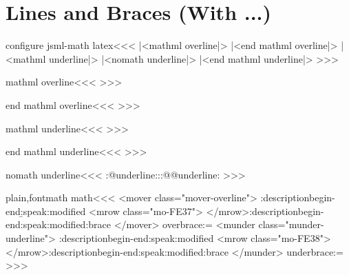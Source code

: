 {%
\section{Lines and Braces (With ...)}


\<configure jsml-math latex\><<<
   {\bgroup\ifmathml |<mathml overline|>\else
         \fi}
   {\ifmathml |<end mathml overline|>\else 
                  \fi\egroup}
   {\bgroup
    \ifmathml |<mathml underline|>%
    \else |<nomath underline|>%
          \fi}
   {\ifmathml |<end mathml underline|>\else
                   \fi \egroup}
>>>

\<mathml overline\><<<
%
>>>

\<end mathml overline\><<<
%
>>>

\<mathml underline\><<<
% 
>>>

\<end mathml underline\><<<
%
>>>

\<nomath underline\><<<
\expandafter\everymath
\expandafter{\expandafter\everymath
             \expandafter{\the\everymath}}%
\let\o::@underline:\o:@@underline:
\def\o:@@underline:{\let\o:@@underline:\o::@underline:}%
>>>



\<plain,fontmath math\><<<
   {
         {<mover class="mover-overline">%
                  \add:description{begin-end}{\b:speak:modified}%
                  <mrow class="mo-FE37">}
         {</mrow>\add:description{begin-end}{\a:speak:modified:brace}%
          </mover>}
         {}%
   }
   {\let\o:overbrace:=\displaystyle}
   {}
   {
         {<munder class="munder-underline">%
               \add:description{begin-end}{\a:speak:modified}%
               <mrow class="mo-FE38">}
         {</mrow>\add:description{begin-end}{\a:speak:modified:brace}%
          </munder>}
         {}%
   }
   {\let\o:underbrace:=\displaystyle}
   {}
>>>







}
